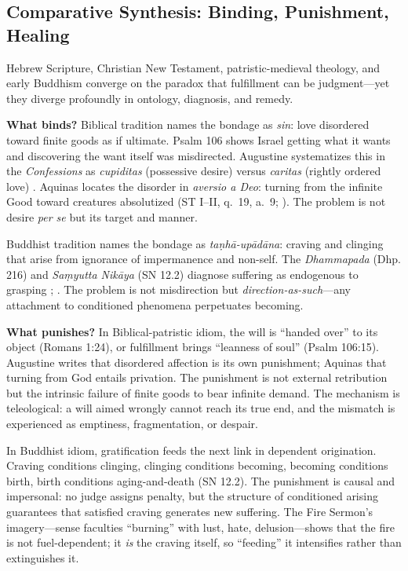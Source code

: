 \subsection*{Comparative Synthesis: Binding, Punishment, Healing}
\label{ssec:iii-synthesis}

Hebrew Scripture, Christian New Testament, patristic-medieval theology, and early Buddhism
converge on the paradox that fulfillment can be judgment---yet they diverge profoundly in
ontology, diagnosis, and remedy.

\textbf{What binds?} Biblical tradition names the bondage as \emph{sin}: love disordered
toward finite goods as if ultimate. Psalm 106 shows Israel getting what it wants and
discovering the want itself was misdirected. Augustine systematizes this in the
\emph{Confessions} as \emph{cupiditas} (possessive desire) versus \emph{caritas} (rightly
ordered love) \parencite[p.~47]{AugustineConfessions1998}. Aquinas locates the disorder in
\emph{aversio a Deo}: turning from the infinite Good toward creatures absolutized (ST I--II,
q.~19, a.~9; \parencite{AquinasST1947}). The problem is not desire \emph{per se} but its
target and manner.

Buddhist tradition names the bondage as \emph{taṇhā-upādāna}: craving and clinging that arise
from ignorance of impermanence and non-self. The \emph{Dhammapada} (Dhp. 216) and
\emph{Saṃyutta Nikāya} (SN 12.2) diagnose suffering as endogenous to grasping
\parencite{BuddharakkhitaDhp1993}; \parencite[p.~536]{BodhiSN2000}. The problem is not
misdirection but \emph{direction-as-such}---any attachment to conditioned phenomena
perpetuates becoming.

\textbf{What punishes?} In Biblical-patristic idiom, the will is ``handed over'' to its object
(Romans 1:24), or fulfillment brings ``leanness of soul'' (Psalm 106:15). Augustine writes
that disordered affection is its own punishment; Aquinas that turning from God entails
privation. The punishment is not external retribution but the intrinsic failure of finite goods
to bear infinite demand. The mechanism is teleological: a will aimed wrongly cannot reach its
true end, and the mismatch is experienced as emptiness, fragmentation, or despair.

In Buddhist idiom, gratification feeds the next link in dependent origination. Craving
conditions clinging, clinging conditions becoming, becoming conditions birth, birth conditions
aging-and-death (SN 12.2). The punishment is causal and impersonal: no judge assigns penalty,
but the structure of conditioned arising guarantees that satisfied craving generates new
suffering. The Fire Sermon's imagery---sense faculties ``burning'' with lust, hate,
delusion---shows that the fire is not fuel-dependent; it \emph{is} the craving itself, so
``feeding'' it intensifies rather than extinguishes it.

